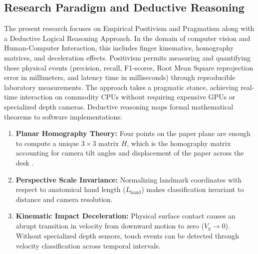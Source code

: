 \subsection{Research Paradigm and Deductive Reasoning}
\label{subsec:meth_paradigm}
The present research focuses on Empirical Positivism and Pragmatism along with a Deductive Logical Reasoning Approach. In the domain of computer vision and Human-Computer Interaction, this includes finger kinematics, homography matrices, and deceleration effects. Positivism permits measuring and quantifying these physical events (precision, recall, F1-scores, Root Mean Square reprojection error in millimeters, and latency time in milliseconds) through reproducible laboratory measurements. The approach takes a pragmatic stance, achieving real-time interaction on commodity CPUs without requiring expensive GPUs or specialized depth cameras. Deductive reasoning maps formal mathematical theorems to software implementations:
\begin{enumerate}
    \item \textbf{Planar Homography Theory:} Four points on the paper plane are enough to compute a unique $3 \times 3$ matrix $H$, which is the homography matrix accounting for camera tilt angles and displacement of the paper across the desk \cite{Pirchheim2011Homography}.
    \item \textbf{Perspective Scale Invariance:} Normalizing landmark coordinates with respect to anatomical hand length ($L_{\text{hand}}$) makes classification invariant to distance and camera resolution.
    \item \textbf{Kinematic Impact Deceleration:} Physical surface contact causes an abrupt transition in velocity from downward motion to zero ($V_y \to 0$). Without specialized depth sensors, touch events can be detected through velocity classification across temporal intervals.
\end{enumerate}

